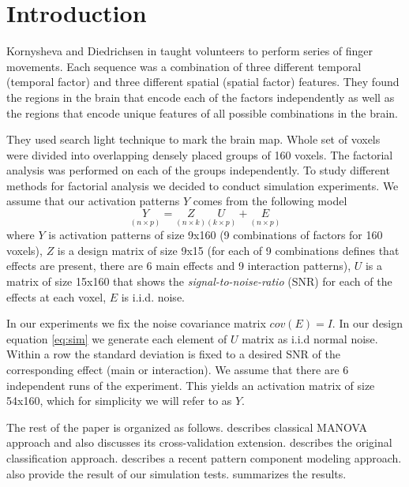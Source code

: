 \documentclass[paper=a4,fontsize=12pt]{scrartcl}
\numberwithin{equation}{section} %
\numberwithin{figure}{section} %
\numberwithin{table}{section} %
\begin{document}
\section*{Introduction}

 Kornysheva and Diedrichsen in \cite{Kornysheva2014} taught volunteers to perform series of finger movements. Each sequence was a combination of three different temporal (temporal factor) and three different spatial (spatial factor) features. They found the regions in the brain that encode each of the factors independently as well as the regions that encode unique features of all possible combinations in the brain. 

They used search light technique to mark the brain map. Whole set of voxels were divided into overlapping densely placed groups of 160 voxels. The factorial analysis was performed on each of the groups independently. To study different methods for factorial analysis we decided to conduct simulation experiments. We assume that our activation patterns $Y$ comes from the following model
\begin{equation}\tag{*}
\underset{\left(n\times p\right)}{Y}=\underset{\left(n\times k\right)}{Z}\underset{\left(k\times p\right)}{U}+\underset{\left(n\times p\right)}{E}
\label{eq:sim}
\end{equation}
where $Y$ is activation patterns of size 9x160 (9 combinations of factors for 160 voxels), $Z$ is a design matrix of size 9x15 (for each of 9 combinations defines that effects are present, there are 6 main effects and 9 interaction patterns), $U$ is a matrix of size 15x160 that shows the \emph{signal-to-noise-ratio} (SNR) for each of the effects at each voxel, $E$ is i.i.d. noise. 

In our experiments we fix the noise covariance matrix $cov(E)=I$. In our design equation \eqref{eq:sim} we generate each element of $U$ matrix as i.i.d normal noise. Within a row the standard deviation is fixed to a desired SNR of the corresponding effect (main or interaction). We assume that there are 6 independent runs of the experiment. This yields an activation matrix of size 54x160, which for simplicity we will refer to as $Y$.

The rest of the paper is organized as follows.  describes classical MANOVA approach and also discusses its cross-validation extension.  describes the original classification approach.  describes a recent pattern component modeling approach.  also provide the result of our simulation tests.  summarizes the results.
\end{document}

